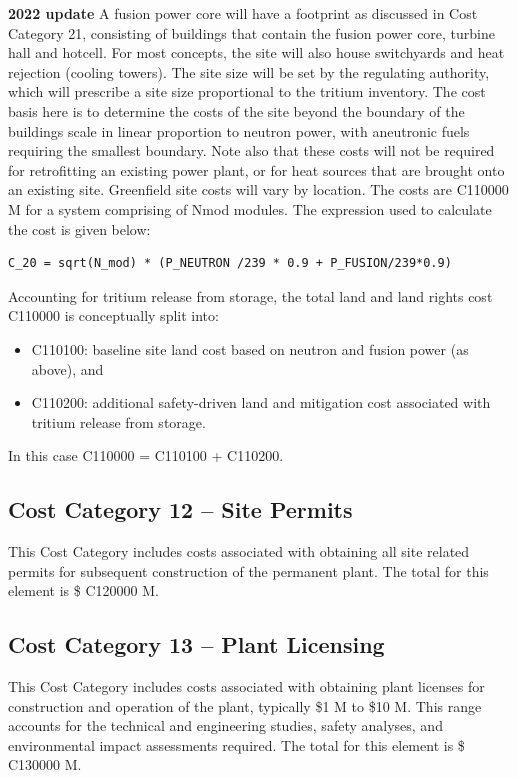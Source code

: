  \textbf{2022 update} 
A fusion power core will have a footprint as discussed in Cost Category 21, consisting of buildings that contain the fusion power core, turbine hall and hotcell. For most concepts, the site will also house switchyards and heat rejection (cooling towers). The site size will be set by the regulating authority, which will prescribe a site size proportional to the tritium inventory.  The cost basis here is to determine the costs of the site beyond the boundary of the buildings scale in linear proportion to neutron power, with aneutronic fuels requiring the smallest boundary.  Note also that these costs will not be required for retrofitting an existing power plant, or for heat sources that are brought onto an existing site.  Greenfield site costs will vary by location. The costs are C110000 M for a system comprising of Nmod modules. 
 The expression used to calculate the cost is given below: 
\begin{verbatim} 
C_20 = sqrt(N_mod) * (P_NEUTRON /239 * 0.9 + P_FUSION/239*0.9)\end{verbatim} 

\ifsafetycosts
Accounting for tritium release from storage, the total land and land rights cost C110000 is conceptually split into:
\begin{itemize}
  \item C110100: baseline site land cost based on neutron and fusion power (as above), and
  \item C110200: additional safety-driven land and mitigation cost associated with tritium release from storage.
\end{itemize}
In this case C110000 = C110100 + C110200.
\fi


\subsection*{Cost Category 12 – Site Permits} 
This Cost Category includes costs associated with obtaining all site related permits for subsequent construction of the permanent plant.  The total for this element is \$ C120000 M.

\subsection*{Cost Category 13 – Plant Licensing} 
This Cost Category includes costs associated with obtaining plant licenses for construction and operation of the plant, typically \$1 M to \$10 M. This range accounts for the technical and engineering studies, safety analyses, and environmental impact assessments required.  The total for this element is \$ C130000 M.

